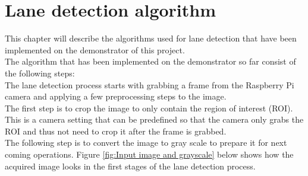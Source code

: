 \section{Lane detection algorithm}
This chapter will describe the algorithms used for lane detection that have been implemented on the demonstrator of this project.\\

The algorithm that has been implemented on the demonstrator so far consist of the following steps:\\

The lane detection process starts with grabbing a frame from the Raspberry Pi camera and applying a few preprocessing steps to the image.\\

The first step is to crop the image to only contain the region of interest (ROI). This is a camera setting that can be predefined so that the camera only grabs the ROI and thus not need to crop it after the frame is grabbed.\\

The following step is to convert the image to gray scale to prepare it for next coming operations. Figure \ref{fig:Input image and grayscale} below shows how the acquired image looks in the first stages of the lane detection process.


